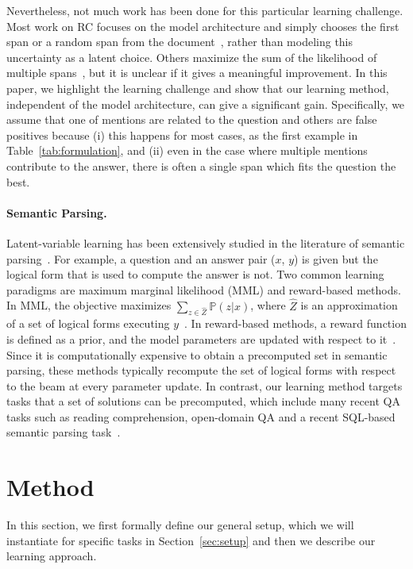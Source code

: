 \documentclass[11pt,a4paper]{article}
\begin{document}
Nevertheless, not much work has been done for this particular learning challenge. Most work on RC focuses on the model architecture and simply chooses the first span or a random span from the document~\citep{triviaqa,tay2018densely,multiqa}, rather than modeling this uncertainty as a latent choice.
Others maximize the sum of the likelihood of multiple spans~\citep{kadlec2016text,neural-cascades,clark2018multi,lee2019latent}, but it is unclear if it gives a meaningful improvement.
In this paper, we highlight the learning challenge and show that our learning method, independent of the model architecture, can give a significant gain. Specifically, we assume that one of mentions are related to the question and others are false positives because (i) this happens for most cases, as the first example in Table~\ref{tab:formulation}, and (ii) even in the case where multiple mentions contribute to the answer, there is often a single span which fits the question the best.

\paragraph{Semantic Parsing.} Latent-variable learning has been extensively studied in the literature of semantic parsing~\citep{Zettlemoyer2005LearningTM,clarke2010driving,liang2013learning,berant2013semantic,artzi2013weakly}.
For example, a question and an answer pair ($x$, $y$) is given but the logical form that is used to compute the answer is not.
Two common learning paradigms are maximum marginal likelihood (MML) and reward-based methods. In MML, the objective maximizes $\sum_{z \in \hat{Z}}  \mathbb{P}(z|x)$, where $\hat{Z}$ is an approximation of a set of logical forms executing $y$~\citep{liang2013learning,berant2013semantic,krishnamurthy2017neural}.
In reward-based methods, a reward function is defined as a prior, and the model parameters are updated with respect to it~\citep{sequentialwikitable,imlfirst,mapo}.
Since it is computationally expensive to obtain a precomputed set in semantic parsing, these methods typically recompute the set of logical forms with respect to the beam at every parameter update.
In contrast, our learning method targets tasks that a set of solutions can be precomputed, which include many recent QA tasks such as reading comprehension, open-domain QA and a recent SQL-based semantic parsing task~\cite{wikisql}.
 \section{Method}\label{sec:method}In this section, we first formally define our general setup, which we will instantiate for specific tasks in Section~\ref{sec:setup} and then we describe our learning approach.
\end{document}
